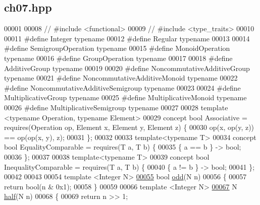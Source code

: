 \hypertarget{ch07_8hpp_source}{}\subsection{ch07.\+hpp}

\begin{DoxyCode}
00001 
00008 \textcolor{comment}{// #include <functional>}
00009 \textcolor{comment}{// #include <type\_traits>}
00010 
00011 \textcolor{preprocessor}{#define Integer typename}
00012 \textcolor{preprocessor}{#define Regular typename}
00013 
00014 \textcolor{preprocessor}{#define SemigroupOperation typename}
00015 \textcolor{preprocessor}{#define MonoidOperation typename}
00016 \textcolor{preprocessor}{#define GroupOperation typename}
00017 
00018 \textcolor{preprocessor}{#define AdditiveGroup typename}
00019 
00020 \textcolor{preprocessor}{#define NoncommutativeAdditiveGroup typename}
00021 \textcolor{preprocessor}{#define NoncommutativeAdditiveMonoid typename}
00022 \textcolor{preprocessor}{#define NoncommutativeAdditiveSemigroup typename}
00023 
00024 \textcolor{preprocessor}{#define MultiplicativeGroup typename}
00025 \textcolor{preprocessor}{#define MultiplicativeMonoid typename}
00026 \textcolor{preprocessor}{#define MultiplicativeSemigroup typename}
00027 
00028 \textcolor{keyword}{template} <\textcolor{keyword}{typename} Operation, \textcolor{keyword}{typename} Element>
00029 concept \textcolor{keywordtype}{bool} Associative = requires(Operation op, Element x, Element y, Element z) \{
00030   op(x, op(y, z)) == op(op(x, y), z);
00031 \};
00032 
00033 \textcolor{keyword}{template}<\textcolor{keyword}{typename} T>
00034 concept \textcolor{keywordtype}{bool} EqualityComparable = requires(T a, T b) \{
00035   \{ a == b \} -> bool;
00036 \};
00037 
00038 \textcolor{keyword}{template}<\textcolor{keyword}{typename} T>
00039 concept \textcolor{keywordtype}{bool} InequalityComparable = requires(T a, T b) \{
00040   \{ a != b \} -> bool;
00041 \};
00042 
00043 
00054 \textcolor{keyword}{template} <Integer N>
\hypertarget{ch07_8hpp_source.tex_l00055}{}\hyperlink{ch07_8hpp_a77588a29d6eeebc52834d05039b7f83f}{00055} \textcolor{keywordtype}{bool} \hyperlink{ch07_8hpp_a77588a29d6eeebc52834d05039b7f83f}{odd}(N n)
00056 \{
00057   \textcolor{keywordflow}{return} bool(n & 0x1);
00058 \}
00059 
00066 \textcolor{keyword}{template} <Integer N>
\hypertarget{ch07_8hpp_source.tex_l00067}{}\hyperlink{ch07_8hpp_a5c310c077a590421ce629a0a40d6b841}{00067} N \hyperlink{ch07_8hpp_a5c310c077a590421ce629a0a40d6b841}{half}(N n)
00068 \{
00069   \textcolor{keywordflow}{return} n >> 1;

\end{DoxyCode}

